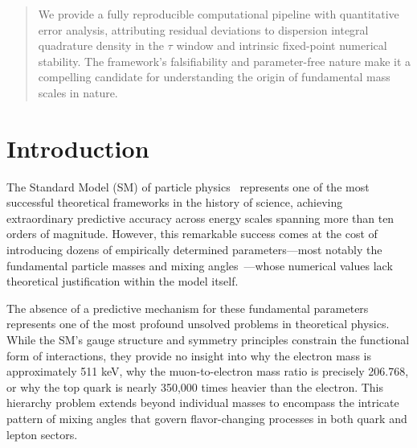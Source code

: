 \documentclass[%
amsmath,amssymb,
aps,
prb,
floatfix,
twocolumn
]{revtex4-2}
\begin{document}
\begin{abstract}
We provide a fully reproducible computational pipeline with quantitative error analysis, attributing residual deviations to dispersion integral quadrature density in the $\tau$ window and intrinsic fixed-point numerical stability. The framework's falsifiability and parameter-free nature make it a compelling candidate for understanding the origin of fundamental mass scales in nature.
\end{abstract}


\maketitle

\section{Introduction}
\label{sec:introduction}

The Standard Model (SM) of particle physics~\cite{SM-ref,weinberg-book,Weinberg1979} represents one of the most successful theoretical frameworks in the history of science, achieving extraordinary predictive accuracy across energy scales spanning more than ten orders of magnitude. However, this remarkable success comes at the cost of introducing dozens of empirically determined parameters—most notably the fundamental particle masses and mixing angles~\cite{PDG2022,PDG2025}—whose numerical values lack theoretical justification within the model itself.

The absence of a predictive mechanism for these fundamental parameters represents one of the most profound unsolved problems in theoretical physics. While the SM's gauge structure and symmetry principles constrain the functional form of interactions, they provide no insight into why the electron mass is approximately 511 keV, why the muon-to-electron mass ratio is precisely 206.768, or why the top quark is nearly 350,000 times heavier than the electron. This hierarchy problem extends beyond individual masses to encompass the intricate pattern of mixing angles that govern flavor-changing processes in both quark and lepton sectors.
\end{document}
